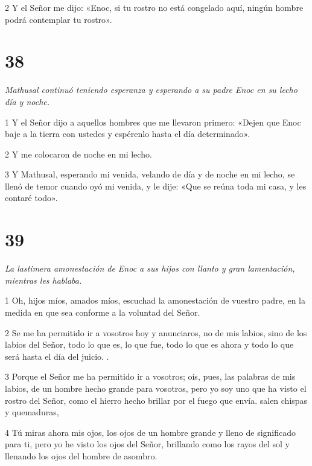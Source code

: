 \par 2 Y el Señor me dijo: «Enoc, si tu rostro no está congelado aquí, ningún hombre podrá contemplar tu rostro».

\chapter{38}

\par \textit{Mathusal continuó teniendo esperanza y esperando a su padre Enoc en su lecho día y noche.}

\par 1 Y el Señor dijo a aquellos hombres que me llevaron primero: «Dejen que Enoc baje a la tierra con ustedes y espérenlo hasta el día determinado».

\par 2 Y me colocaron de noche en mi lecho.

\par 3 Y Mathusal, esperando mi venida, velando de día y de noche en mi lecho, se llenó de temor cuando oyó mi venida, y le dije: «Que se reúna toda mi casa, y les contaré todo».

\chapter{39}

\par \textit{La lastimera amonestación de Enoc a sus hijos con llanto y gran lamentación, mientras les hablaba.}

\par 1 Oh, hijos míos, amados míos, escuchad la amonestación de vuestro padre, en la medida en que sea conforme a la voluntad del Señor.

\par 2 Se me ha permitido ir a vosotros hoy y anunciaros, no de mis labios, sino de los labios del Señor, todo lo que es, lo que fue, todo lo que es ahora y todo lo que será hasta el día del juicio. .

\par 3 Porque el Señor me ha permitido ir a vosotros; oís, pues, las palabras de mis labios, de un hombre hecho grande para vosotros, pero yo soy uno que ha visto el rostro del Señor, como el hierro hecho brillar por el fuego que envía. salen chispas y quemaduras,

\par 4 Tú miras ahora mis ojos, los ojos de un hombre grande y lleno de significado para ti, pero yo he visto los ojos del Señor, brillando como los rayos del sol y llenando los ojos del hombre de asombro.

